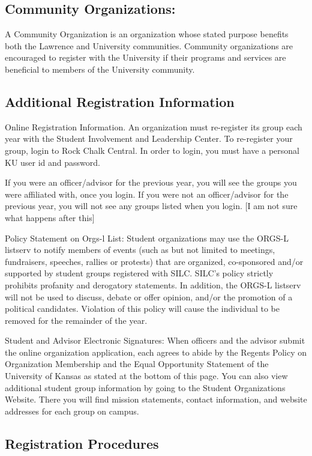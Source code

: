\subsection*{Community Organizations:} A Community Organization is an organization whose stated purpose benefits both the Lawrence and University communities. Community organizations are encouraged to register with the University if their programs and services are beneficial to members of the University community.

\subsection{Additional Registration Information}

Online Registration Information. An organization must re-register its group each year with the Student Involvement and Leadership Center. To re-register your group, login to Rock Chalk Central. In order to login, you must have a personal KU user id and password.

If you were an officer/advisor for the previous year, you will see the groups you were affiliated with, once you login.
If you were not an officer/advisor for the previous year, you will not see any groups listed when you login. [I am not sure what happens after this]

Policy Statement on Orgs-l List:  Student organizations may use the ORGS-L listserv to notify members of events (such as but not limited to meetings, fundraisers, speeches, rallies or protests) that are organized, co-sponsored and/or supported by student groups registered with SILC.  SILC's policy strictly prohibits profanity and derogatory statements.  In addition, the ORGS-L listserv will not be used to discuss, debate or offer opinion, and/or the promotion of a political candidates. Violation of this policy will cause the individual to be removed for the remainder of the year.

Student and Advisor Electronic Signatures: When officers and the advisor submit the online organization application, each agrees to abide by the Regents Policy on Organization Membership and the Equal Opportunity Statement of the University of Kansas as stated at the bottom of this page. You can also view additional student group information by going to the Student Organizations Website. There you will find mission statements, contact information, and website addresses for each group on campus.

\subsection{Registration Procedures}

